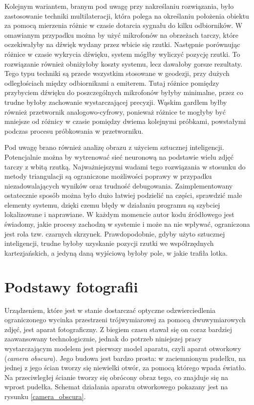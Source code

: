 Kolejnym wariantem, branym pod uwagę przy nakreślaniu rozwiązania, było zastosowanie techniki multilateracji, która polega na określaniu położenia obiektu za pomocą mierzenia różnic w czasie dotarcia sygnału do kilku odbiorników. W omawianym przypadku można by użyć mikrofonów na obrzeżach tarczy, które oczekiwałyby na dźwięk wydany przez wbicie się rzutki. Następnie porównując różnice w czasie wykrycia dźwięku, system mógłby wyliczyć pozycję rzutki. To rozwiązanie również obniżyłoby koszty systemu, lecz dawałoby gorsze rezultaty. Tego typu techniki są przede wszystkim stosowane w geodezji, przy dużych odległościach między odbiornikami a emiterem. Tutaj różnice pomiędzy przybyciem dźwięku do poszczególnych mikrofonów byłyby minimalne, przez co trudne byłoby zachowanie wystarczającej precyzji. Wąskim gardłem byłby również przetwornik analogowo-cyfrowy, ponieważ różnice te mogłyby być mniejsze od różnicy w czasie pomiędzy dwiema kolejnymi próbkami, powstałymi podczas procesu próbkowania w przetworniku.

Pod uwagę brano również analizę obrazu z użyciem sztucznej inteligencji. Potencjalnie można by wytrenować sieć neuronową na podstawie wielu zdjęć tarczy z wbitą rzutką. Najważniejszymi wadami tego rozwiązania w stosunku do metody triangulacji są ograniczone możliwości poprawy w przypadku niezadowalających wyników oraz trudność debugowania. Zaimplementowany ostatecznie sposób można było dużo łatwiej podzielić na części, sprawdzić małe elementy systemu, dzięki czemu błędy w działaniu programu są szybciej lokalizowane i naprawiane. W każdym momencie autor kodu źródłowego jest świadomy, jakie procesy zachodzą w systemie i może na nie wpływać, ograniczona jest rola tzw. czarnych skrzynek. Prawdopodobnie, gdyby użyto sztucznej inteligencji, trudne byłoby uzyskanie pozycji rzutki we współrzędnych kartezjańskich, a jedyną daną wyjściową byłoby pole, w jakie trafiła lotka.

\section{Podstawy fotografii}
Urządzeniem, które jest w stanie dostarczać optyczne odzwierciedlenia ograniczonego wycinka przestrzeni trójwymiarowej za pomocą dwuwymiarowych zdjęć, jest aparat fotograficzny. Z biegiem czasu stawał się on coraz bardziej zaawansowany technologicznie, jednak do potrzeb niniejszej pracy wystarczającym modelem jest pierwszy model aparatu, czyli aparat otworkowy (\textit{camera obscura}). Jego budowa jest bardzo prosta: w zaciemnionym pudełku, na jednej z jego ścian tworzy się niewielki otwór, za pomocą którego wpada światło. Na przeciwległej ścianie tworzy się obrócony obraz tego, co znajduje się na wprost pudełka. Schemat działania aparatu otworkowego pokazany jest na rysunku \ref{camera_obscura}.

